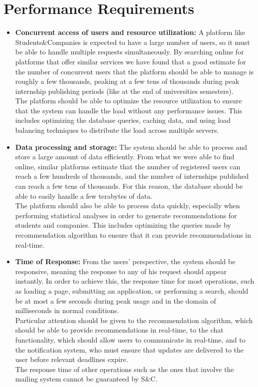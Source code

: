 \section{Performance Requirements}
\begin{itemize}
    \item \textbf{Concurrent access of users and resource utilization:} A platform like Students\&Companies is expected to have a large
    number of users, so it must be able to handle multiple requests simultaneously. By searching online for platforms that offer similar
    services we have found that a good estimate for the number of concurrent users that the platform should be able to manage is roughly
    a few thousands, peaking at a few tens of thousands during peak internship publishing periods (like at the end of universities semesters). \\
    The platform should be able to optimize the resource utilization to ensure that the system can handle the load without any performance
    issues. This includes optimizing the database queries, caching data, and using load balancing techniques to distribute the load across
    multiple servers.
    
    \item \textbf{Data processing and storage:} The system should be able to process and store a large amount of data efficiently. From 
    what we were able to find online, similar platforms estimate that the number of registered users can reach a few hundreds of thousands,
    and the number of internships published can reach a few tens of thousands. For this reason, the database should be able to easily handle
    a few terabytes of data. \\
    The platform should also be able to process data quickly, especially when performing statistical analyses in order to generate recommendations 
    for students and companies. This includes optimizing the queries made by recommendation algorithm to ensure that it can provide 
    recommendations in real-time.

    \item \textbf{Time of Response:} From the users' perspective, the system should be responsive, meaning the response to any of his request 
    should appear instantly. In order to achieve this, the response time for most operations, such as loading a page, submitting an application, 
    or performing a search, should be at most a few seconds during peak usage and in the domain of milliseconds in normal conditions. \\
    Particular attention should be given to the recommendation algorithm, which should be able to provide recommendations in real-time,
    to the chat functionality, which should allow users to communicate in real-time, and to the notification system, who must ensure that
    updates are delivered to the user before relevant deadlines expire. \\
    The response time of other operations such as the ones that involve the mailing system cannot be guaranteed by S\&C.
\end{itemize}


